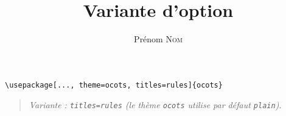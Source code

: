 \documentclass[11pt]{ocots-book}
\title{Variante d'option}
\author{Prénom \textsc{Nom}}
\newcommand{\ocotsvariantnote}[1]{\begin{quote}\itshape Variante : #1\end{quote}}
\begin{document}
\maketitle

\begin{lstlisting}
\usepackage[..., theme=ocots, titles=rules]{ocots}
\end{lstlisting}
\ocotsvariantnote{\texttt{titles=rules} (le th\`eme \texttt{ocots} utilise par d\'efaut \texttt{plain}).}

\end{document}
